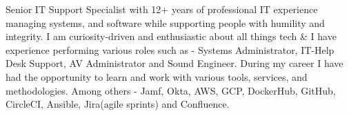 

\begin{cvparagraph}

	Senior IT Support Specialist with 12+ years of professional IT experience managing systems, and software while supporting people with humility and integrity. I am curiosity-driven and enthusiastic about all things tech \& I have experience performing various roles such as - Systems Administrator, IT-Help Desk Support, AV Administrator and Sound Engineer. During my career I have had the opportunity to learn and work with various tools, services, and methodologies. Among others - Jamf, Okta, AWS, GCP, DockerHub, GitHub, CircleCI, Ansible, Jira(agile sprints) and Confluence.
\end{cvparagraph}
